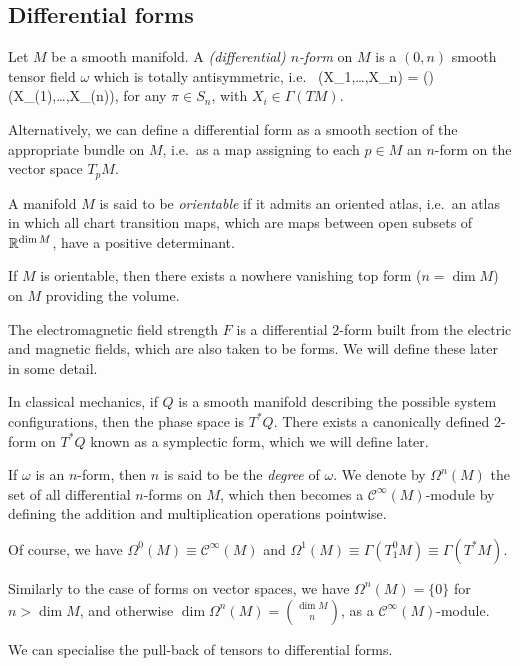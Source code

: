 \subsection{Differential forms}


\bd
Let $M$ be a smooth manifold. A \emph{(differential) $n$-form} on $M$ is a $(0,n)$ smooth tensor field $\omega$ which is totally antisymmetric, i.e.\
\bse
\omega(X_1,\ldots,X_n) = \sgn(\pi)\, \omega(X_{\pi(1)},\ldots,X_{\pi(n)}),
\ese
for any $\pi \in S_n$, with $X_i\in \Gamma(TM)$.  
\ed

Alternatively, we can define a differential form as a smooth section of the appropriate bundle on $M$, i.e.\ as a map assigning to each $p\in M$ an $n$-form on the vector space $T_pM$.

\be
\ben[label=\alph*)]
\item A manifold $M$ is said to be \emph{orientable} if it admits an oriented atlas, i.e.\ an atlas in which all chart transition maps, which are maps between open subsets of $\mathbb{R}^{\dim M}$, have a positive determinant.

If $M$ is orientable, then there exists a nowhere vanishing top form ($n=\dim M$) on $M$ providing the volume.
\item The electromagnetic field strength $F$ is a differential $2$-form built from the electric and magnetic fields, which are also taken to be forms. We will define these later in some detail.
\item In classical mechanics, if $Q$ is a smooth manifold describing the possible system configurations, then the phase space is $T^*Q$. There exists a canonically defined $2$-form on $T^*Q$ known as a symplectic form, which we will define later.
\een
\ee

If $\omega$ is an $n$-form, then $n$ is said to be the \emph{degree} of $\omega$. We denote by $\Omega^n(M)$ the set of all differential $n$-forms on $M$, which then becomes a $\mathcal{C}^\infty(M)$-module by defining the addition and multiplication operations pointwise.

\be
Of course, we have $\Omega^0(M)\equiv \mathcal{C}^\infty(M)$ and $\Omega^1(M)\equiv \Gamma(T^0_1M)\equiv\Gamma(T^*M)$.
\ee

Similarly to the case of forms on vector spaces, we have $\Omega^n(M)=\{0\}$ for $n>\dim M$, and otherwise $\dim \Omega^n(M)= {{\dim M}\choose{n}}$, as a $\mathcal{C}^\infty(M)$-module.

We can specialise the pull-back of tensors to differential forms.

